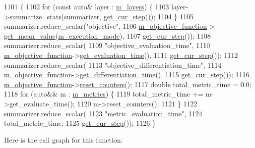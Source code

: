 \begin{DoxyCode}
1101                                                      \{
1102   \textcolor{keywordflow}{for} (\textcolor{keyword}{const} \textcolor{keyword}{auto}& layer : \hyperlink{classlbann_1_1model_a0229fc226ec163d1411548446104569d}{m\_layers}) \{
1103     layer->summarize\_stats(summarizer, \hyperlink{classlbann_1_1model_ad0cdcba177434b52dc9c4a97be183a92}{get\_cur\_step}());
1104   \}
1105   summarizer.reduce\_scalar(\textcolor{stringliteral}{"objective"},
1106                            \hyperlink{classlbann_1_1model_a24c50e7108dd7698671aed7df5b22e8b}{m\_objective\_function}->
      \hyperlink{classlbann_1_1objective__function_a0aa271e497363e97ba3741292961d47d}{get\_mean\_value}(\hyperlink{classlbann_1_1model_a2166e2aad256a335ace3bdcae5da2614}{m\_execution\_mode}),
1107                            \hyperlink{classlbann_1_1model_ad0cdcba177434b52dc9c4a97be183a92}{get\_cur\_step}());
1108   summarizer.reduce\_scalar(
1109     \textcolor{stringliteral}{"objective\_evaluation\_time"},
1110     \hyperlink{classlbann_1_1model_a24c50e7108dd7698671aed7df5b22e8b}{m\_objective\_function}->\hyperlink{classlbann_1_1objective__function_a4a23b4c51fe61584c97a471d28f7b8d7}{get\_evaluation\_time}(),
1111     \hyperlink{classlbann_1_1model_ad0cdcba177434b52dc9c4a97be183a92}{get\_cur\_step}());
1112   summarizer.reduce\_scalar(
1113     \textcolor{stringliteral}{"objective\_differentiation\_time"},
1114     \hyperlink{classlbann_1_1model_a24c50e7108dd7698671aed7df5b22e8b}{m\_objective\_function}->\hyperlink{classlbann_1_1objective__function_af968b6949c170721d04895f1268b03dd}{get\_differentiation\_time}(),
1115     \hyperlink{classlbann_1_1model_ad0cdcba177434b52dc9c4a97be183a92}{get\_cur\_step}());
1116   \hyperlink{classlbann_1_1model_a24c50e7108dd7698671aed7df5b22e8b}{m\_objective\_function}->\hyperlink{classlbann_1_1objective__function_a92b248be17049b1d7e82accbd913d6f1}{reset\_counters}();
1117   \textcolor{keywordtype}{double} total\_metric\_time = 0.0;
1118   \textcolor{keywordflow}{for} (\textcolor{keyword}{auto}&& m : \hyperlink{classlbann_1_1model_ae75c9aafe9e5a93980cc1bbae986bc79}{m\_metrics}) \{
1119     total\_metric\_time += m->get\_evaluate\_time();
1120     m->reset\_counters();
1121   \}
1122   summarizer.reduce\_scalar(
1123     \textcolor{stringliteral}{"metric\_evaluation\_time"},
1124     total\_metric\_time,
1125     \hyperlink{classlbann_1_1model_ad0cdcba177434b52dc9c4a97be183a92}{get\_cur\_step}());
1126 \}
\end{DoxyCode}
Here is the call graph for this function\+:\nopagebreak
